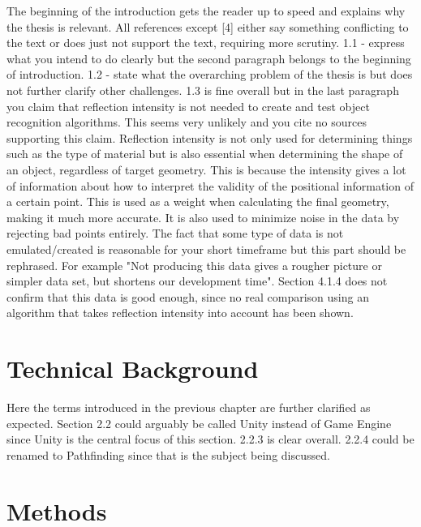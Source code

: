 \documentclass[12pt,a4paper,twoside,openright]{report}
\begin{document}
	The beginning of the introduction gets the reader up to speed and explains
	why the thesis is relevant. All references except [4] either say something
	conflicting to the text or does just not support the text, requiring more 
	scrutiny. 1.1 - express what you intend to do clearly but the second 
	paragraph belongs to the beginning of introduction. 1.2 - state what the
	overarching problem of the thesis is but does not further clarify other
	challenges. 1.3 is fine overall but in the last paragraph you claim that
	reflection intensity is not needed to create and test object recognition
	algorithms. This seems very unlikely and you cite no sources supporting this
	claim. Reflection intensity is not only used for determining things such as
	the type of material but is also essential when determining the shape of an
	object, regardless of target geometry. This is because the intensity gives a
	lot of information about how to interpret the validity of the positional
	information of a certain point. This is used as a weight when calculating
	the final geometry, making it much more accurate. It is also used to
	minimize noise in the data by rejecting bad points entirely. The fact that
	some type of data is not emulated/created is reasonable for your short
	timeframe but this part should be rephrased. For example "Not producing this
	data gives a rougher picture or simpler data set, but shortens our 
	development time". Section 4.1.4 does not confirm that this data is good 
	enough, since no real comparison using an algorithm that takes reflection 
	intensity into account has been shown. 

\section*{Technical Background}

	Here the terms introduced in the previous chapter are further clarified as
	expected. Section 2.2 could arguably be called Unity instead of Game Engine
	since Unity is the central focus of this section. 2.2.3 is clear overall.
	2.2.4 could be renamed to Pathfinding since that is the subject being
	discussed. 

\section*{Methods}
\end{document}
